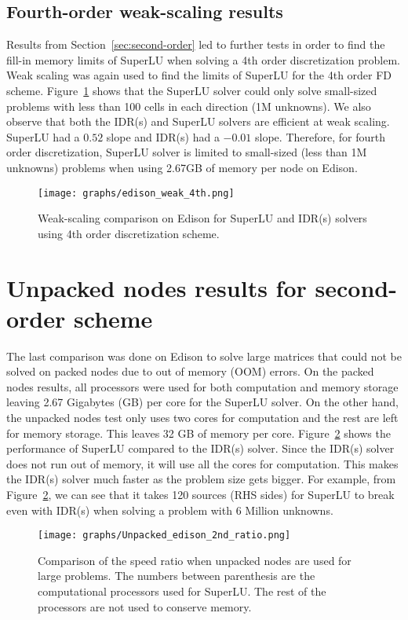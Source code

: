 \documentclass[12pt]{article}
\begin{document}
\subsection{Fourth-order weak-scaling results}
Results from Section~\ref{sec:second-order} led to further tests in order to find the fill-in memory limits of SuperLU when solving a 4th order discretization problem. Weak scaling was again used to find the limits of SuperLU for the 4th order FD scheme. Figure~\ref{fig:edison_weak_4nd} shows that the SuperLU solver could only solve small-sized problems with less than 100 cells in each direction (1M unknowns). We also observe that both the IDR(s) and SuperLU solvers are efficient at weak scaling. SuperLU had a $0.52$ slope and IDR(s) had a $-0.01$ slope. Therefore, for fourth order discretization, SuperLU solver is limited to small-sized (less than 1M unknowns) problems when using 2.67GB of memory per node on Edison.
\begin{figure}
	\centering
 \texttt{[image: graphs/edison\_weak\_4th.png]}
  \caption{Weak-scaling comparison on Edison for SuperLU and IDR(s) solvers using 4th order discretization scheme.}
  \label{fig:edison_weak_4nd}
\end{figure}

\section{Unpacked nodes results for second-order scheme}
The last comparison was done on Edison to solve large matrices that could not be solved on packed nodes due to out of memory (OOM) errors. On the packed nodes results, all processors were used for both computation and memory storage leaving 2.67 Gigabytes (GB) per core for the SuperLU solver. On the other hand, the unpacked nodes test only uses two cores for computation and the rest are left for memory storage. This leaves 32 GB of memory per core. Figure~\ref{fig:Unpacked_edison_2nd_ratio} shows the performance of SuperLU compared to the IDR(s) solver. Since the IDR(s) solver does not run out of memory, it will use all the cores for computation. This makes the IDR(s) solver much faster as the problem size gets bigger. For example, from Figure~\ref{fig:Unpacked_edison_2nd_ratio}, we can see that it takes 120 sources (RHS sides) for SuperLU to break even with IDR(s) when solving a problem with 6 Million unknowns.
\begin{figure}
	\centering
 \texttt{[image: graphs/Unpacked\_edison\_2nd\_ratio.png]}
  \caption{Comparison of the speed ratio when unpacked nodes are used for large problems. The numbers between parenthesis are the computational processors used for SuperLU. The rest of the processors are not used to conserve memory. }
  \label{fig:Unpacked_edison_2nd_ratio}
\end{figure}
\end{document}

